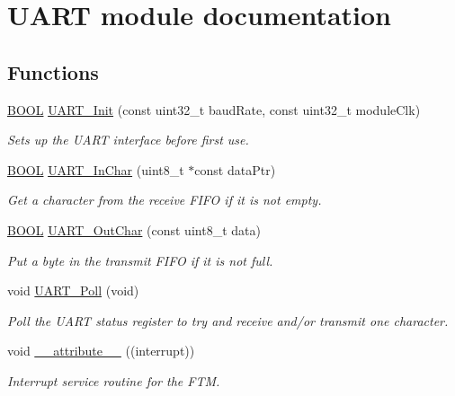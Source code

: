 \hypertarget{group___u_a_r_t__module}{}\section{U\+A\+R\+T module documentation}
\label{group___u_a_r_t__module}
\subsection*{Functions}
\begin{DoxyCompactItemize}
\item 
\hyperlink{types_8h_a3e5b8192e7d9ffaf3542f1210aec18dd}{B\+O\+O\+L} \hyperlink{group___u_a_r_t__module_ga79191be14a25cdb749b49a5f2eff9bbf}{U\+A\+R\+T\+\_\+\+Init} (const uint32\+\_\+t baud\+Rate, const uint32\+\_\+t module\+Clk)
\begin{DoxyCompactList}\small\item\em Sets up the U\+A\+R\+T interface before first use. \end{DoxyCompactList}\item 
\hyperlink{types_8h_a3e5b8192e7d9ffaf3542f1210aec18dd}{B\+O\+O\+L} \hyperlink{group___u_a_r_t__module_ga08d2770a685ef783e586bcdf9762aa25}{U\+A\+R\+T\+\_\+\+In\+Char} (uint8\+\_\+t $\ast$const data\+Ptr)
\begin{DoxyCompactList}\small\item\em Get a character from the receive F\+I\+F\+O if it is not empty. \end{DoxyCompactList}\item 
\hyperlink{types_8h_a3e5b8192e7d9ffaf3542f1210aec18dd}{B\+O\+O\+L} \hyperlink{group___u_a_r_t__module_gaa4ebf6ba59a0869e4b9f8a1408f585e9}{U\+A\+R\+T\+\_\+\+Out\+Char} (const uint8\+\_\+t data)
\begin{DoxyCompactList}\small\item\em Put a byte in the transmit F\+I\+F\+O if it is not full. \end{DoxyCompactList}\item 
void \hyperlink{group___u_a_r_t__module_ga799b375101827a18f652a3f28ecefcd0}{U\+A\+R\+T\+\_\+\+Poll} (void)
\begin{DoxyCompactList}\small\item\em Poll the U\+A\+R\+T status register to try and receive and/or transmit one character. \end{DoxyCompactList}\item 
void \hyperlink{group___u_a_r_t__module_ga445500277ba0e363873b34cffc015745}{\+\_\+\+\_\+attribute\+\_\+\+\_\+} ((interrupt))
\begin{DoxyCompactList}\small\item\em Interrupt service routine for the F\+T\+M. \end{DoxyCompactList}\end{DoxyCompactItemize}


